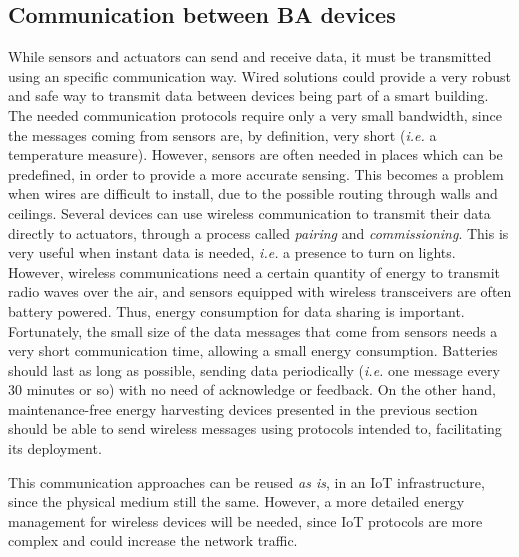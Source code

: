 \subsection{Communication between BA devices}
While sensors and actuators can send and receive data, it must be transmitted using an specific communication way.
Wired solutions could provide a very robust and safe way to transmit data between devices being part of a smart building.
The needed communication protocols require only a very small bandwidth, since the messages coming from sensors are, by definition, very short (\textit{i.e.} a temperature measure).
However, sensors are often needed in places which can be predefined, in order to provide a more accurate sensing.
This becomes a problem when wires are difficult to install, due to the possible routing through walls and ceilings.
Several devices can use wireless communication to transmit their data directly to actuators, through a process called \textit{pairing} and \textit{commissioning}.
This is very useful when instant data is needed, \textit{i.e.} a presence to turn on lights.
However, wireless communications need a certain quantity of energy to transmit radio waves over the air, and sensors equipped with wireless transceivers are often battery powered.
Thus, energy consumption for data sharing is important.
Fortunately, the small size of the data messages that come from sensors needs a very short communication time, allowing a small energy consumption.
Batteries should last as long as possible, sending data periodically (\textit{i.e.} one message every 30 minutes or so) with no need of acknowledge or feedback.
On the other hand, maintenance-free energy harvesting devices presented in the previous section should be able to send wireless messages using protocols intended to, facilitating its deployment.

This communication approaches can be reused \textit{as is}, in an IoT infrastructure, since the physical medium still the same.
However, a more detailed energy management for wireless devices will be needed, since IoT protocols are more complex and could increase the network traffic.

